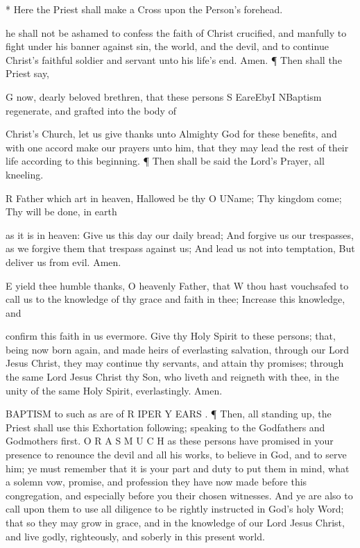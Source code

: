 * Here the Priest shall make a Cross upon the Person's forehead.

he shall not be ashamed to confess the faith of Christ crucified, and manfully to fight under his banner against sin, the world, and the devil, and to continue Christ’s faithful soldier and servant unto his life’s end. Amen. ¶ Then shall the Priest say,

G now, dearly beloved brethren, that these persons S EareEbyI NBaptism regenerate, and grafted into the body of

Christ’s Church, let us give thanks unto Almighty God for these benefits, and with one accord make our prayers unto him, that they may lead the rest of their life according to this beginning. ¶ Then shall be said the Lord's Prayer, all kneeling.

R Father which art in heaven, Hallowed be thy O UName; Thy kingdom come; Thy will be done, in earth

as it is in heaven: Give us this day our daily bread; And forgive us our trespasses, as we forgive them that trespass against us; And lead us not into temptation, But deliver us from evil. Amen.

E yield thee humble thanks, O heavenly Father, that W thou hast vouchsafed to call us to the knowledge of thy grace and faith in thee; Increase this knowledge, and

confirm this faith in us evermore. Give thy Holy Spirit to these persons; that, being now born again, and made heirs of everlasting salvation, through our Lord Jesus Christ, they may continue thy servants, and attain thy promises; through the same Lord Jesus Christ thy Son, who liveth and reigneth with thee, in the unity of the same Holy Spirit, everlastingly. Amen.

BAPTISM to such as are of R IPER Y EARS . ¶ Then, all standing up, the Priest shall use this Exhortation following; speaking to the Godfathers and Godmothers first. O R A S M U C H as these persons have promised in your presence to renounce the devil and all his works, to believe in God, and to serve him; ye must remember that it is your part and duty to put them in mind, what a solemn vow, promise, and profession they have now made before this congregation, and especially before you their chosen witnesses. And ye are also to call upon them to use all diligence to be rightly instructed in God’s holy Word; that so they may grow in grace, and in the knowledge of our Lord Jesus Christ, and live godly, righteously, and soberly in this present world.

